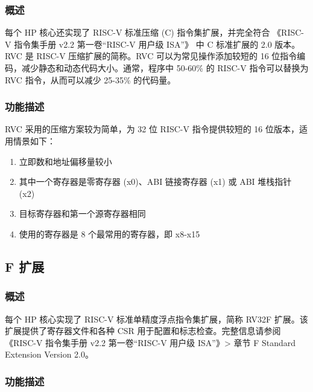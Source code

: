 \documentclass[main\_\_CN.tex]{subfiles}
\begin{document}
\subsubsection{概述}
\label{sec:riscvcpu-cext-overview}

每个 HP 核心还实现了 RISC-V 标准压缩 (C) 指令集扩展，并完全符合 《RISC-V 指令集手册 v2.2 第一卷“RISC-V 用户级 ISA”》 中 C 标准扩展的 2.0 版本。RVC 是 RISC-V 压缩扩展的简称。RVC 可以为常见操作添加较短的 16 位指令编码，减少静态和动态代码大小。通常，程序中 50-60\% 的 RISC-V 指令可以替换为 RVC 指令，从而可以减少 25-35\% 的代码量。

\subsubsection{功能描述}
\label{sec:riscvcpu-cext-func-descr}

RVC 采用的压缩方案较为简单，为 32 位 RISC-V 指令提供较短的 16 位版本，适用情景如下：

\begin{enumerate}
    \item 立即数和地址偏移量较小
    \item 其中一个寄存器是零寄存器 (x0)、ABI 链接寄存器 (x1) 或 ABI 堆栈指针 (x2)
    \item 目标寄存器和第一个源寄存器相同
    \item 使用的寄存器是 8 个最常用的寄存器，即 x8-x15
\end{enumerate}

\newpage

\subsection{F 扩展}
\label{sec:riscvcpu-fpu}

\subsubsection{概述}
\label{sec:riscvcpu-fpu-overview}

每个 HP 核心实现了 RISC-V 标准单精度浮点指令集扩展，简称 RV32F 扩展。该扩展提供了寄存器文件和各种 CSR 用于配置和标志检查。完整信息请参阅《RISC-V 指令集手册 v2.2 第一卷“RISC-V 用户级 ISA”》> 章节 F Standard Extension Version 2.0。

\subsubsection{功能描述}
\label{sec:riscvcpu-fpu-func-descr}
\end{document}
